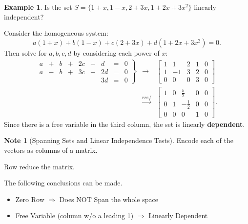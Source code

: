 \documentclass{beamer}
\newcommand{\fn}{\insertframenumber}
\theoremstyle{definition}
\newtheorem*{exa}{Example}
\newtheorem*{nb}{Note}
\begin{document}
\begin{frame}{\fn}
	\begin{exa}
		Is the set $S=\{1+x,1-x,2+3x,1+2x+3x^2\}$ linearly independent?
		
		Consider the homogeneous system:
			\[a(1+x)+b(1-x)+c(2+3x)+d(1+2x+3x^2)=0.\]
		Then solve for $a,b,c,d$ by considering each power of $x$:
			$$\begin{array}{rcl}\left.\begin{array}{rcrcrcrcl}
			a&+&b&+&2c&+&d&=&0\\
			a&-&b&+&3c&+&2d&=&0\\
			&&&&&&3d&=&0
			\end{array}\right\}&\rightarrow&
			\begin{bmatrix}
				1 & 1 & 2 & 1 & 0 \\
				1 & -1 & 3 & 2 & 0 \\
				0 & 0 & 0 & 3 & 0
			\end{bmatrix}
			\\&\xrightarrow{rref}&
			\begin{bmatrix}
				1 & 0 & \frac{5}{2} & 0 & 0 \\
				0 & 1 & -\frac{1}{2} & 0 & 0 \\
				0 & 0 & 0 & 1 & 0
			\end{bmatrix}.
			\end{array}$$
		Since there is a free variable in the third column, the set is linearly \textbf{dependent}.
	\end{exa}
\end{frame}
\begin{frame}{\fn}
	\begin{nb}[Spanning Sets and Linear Independence Tests]
		Encode each of the vectors as columns of a matrix.
		
		Row reduce the matrix.
		
		The following conclusions can be made.
			\begin{itemize}[label=--]
				\item Zero Row $\Rightarrow$ Does NOT Span the whole space
				\item Free Variable (column w/o a leading 1) $\Rightarrow$ Linearly Dependent
			\end{itemize}
	\end{nb}
\end{frame}
\end{document}
